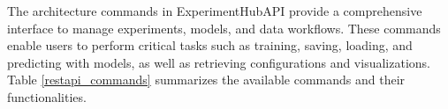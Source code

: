 \documentclass[preprint,12pt, a4paper]{elsarticle}
\begin{document}


The architecture commands in ExperimentHubAPI provide a comprehensive interface to manage experiments, models, and data workflows. These commands enable users to perform critical tasks such as training, saving, loading, and predicting with models, as well as retrieving configurations and visualizations. Table \ref{restapi_commands} summarizes the available commands and their functionalities.
\end{document}
